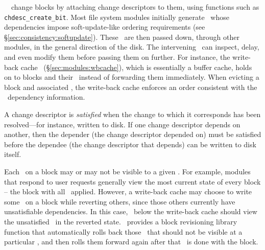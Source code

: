\Kudos\ \modules\ change blocks by attaching change descriptors to them,
using functions such as \texttt{chdesc\_create\_bit}.
%
Most file system modules initially generate \chdescs\ whose
dependencies impose soft-update-like ordering requirements (see
\S\ref{sec:consistency:softupdate}).  These \chdescs\ are then passed down,
through other modules, in the general direction of the disk.  The
intervening \modules\ can
inspect, delay, and even modify them before passing them on further. For
instance, the write-back cache \module\ (\S\ref{sec:modules:wbcache}),
which is essentially a buffer cache, holds
on to blocks and their \chdescs\ instead of forwarding them
immediately. When evicting a block and associated \chdescs, the write-back
cache enforces an order consistent with the \chdesc\ dependency
information.

A change descriptor is \emph{satisfied} when the change to which it
 corresponds has been resolved---for instance, written to disk.
%
If one change descriptor depends on another, then the depender (the change
 descriptor depended on) must be satisfied before the dependee (the change
 descriptor that depends) can be written to disk itself.



Each \chdesc\ on a block may or may not be visible to a given \module.
%
For example, modules that respond to user requests generally view the most
 current state of every block -- the block with all \chdescs\ applied.
%
However, a write-back cache may choose to write some \chdescs\ on a block
 while reverting others, since those others currently have unsatisfiable
 dependencies.
%
In this case, \modules\ below the write-back cache should view the
 unsatisfied \chdescs\ in the reverted state.
%
%
\Kudos\ provides a block revisioning library function that automatically rolls back those
 \chdescs\ that should not be visible at a particular \module, and then
 rolls them forward again after that \module\ is done with the block.



